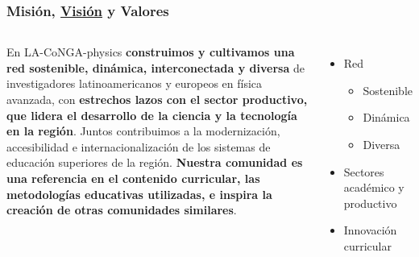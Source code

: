 \begin{frame}[fragile]
\frametitle{Misión, \underline{Visión} y Valores}
\begin{columns}[c] %


En LA-CoNGA-physics {\bf \color{LCblueSec1} construimos y cultivamos una red sostenible, dinámica, interconectada y diversa} de investigadores latinoamericanos y europeos en física avanzada, con {\bf \color{LCblueInst} estrechos lazos con el sector productivo, que lidera el desarrollo de la ciencia y la tecnología en la región}. Juntos contribuimos a la modernización, accesibilidad e internacionalización de los sistemas de educación superiores de la región. {\bf\large \color{LCredInst} Nuestra comunidad es una referencia en el contenido curricular, las metodologías educativas utilizadas, e inspira la creación de otras comunidades similares}.

\begin{itemize}
\item Red
\begin{itemize}
\item Sostenible
\item Dinámica
\item Diversa
\end{itemize}
\item Sectores académico y productivo
\item Innovación curricular 
\end{itemize}


\end{columns}



\end{frame}

